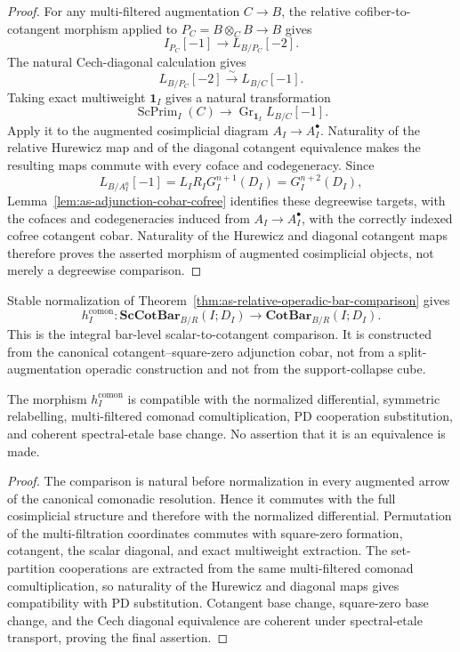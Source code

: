 \begin{proof}
For any multi-filtered augmentation $C\to B$, the relative
cofiber-to-cotangent morphism applied to
$P_C=B\otimes_C B\to B$ gives
\[
    I_{P_C}[-1]
    \longrightarrow
    L_{B/P_C}[-2].
\]
The natural Cech-diagonal calculation gives
\[
    L_{B/P_C}[-2]
    \xrightarrow{\sim}
    L_{B/C}[-1].
\]
Taking exact multiweight $\mathbf1_I$ gives a natural transformation
\[
    \operatorname{ScPrim}_I(C)
    \longrightarrow
    \operatorname{Gr}_{\mathbf1_I}L_{B/C}[-1].
\]
Apply it to the augmented cosimplicial diagram
$A_I\to A_I^\bullet$.  Naturality of the relative Hurewicz map and of the
diagonal cotangent equivalence makes the resulting maps commute with every
coface and codegeneracy.  Since
\[
    L_{B/A_I^n}[-1]
    =
    L_I R_I G_I^{n+1}(D_I)
    =
    G_I^{n+2}(D_I),
\]
Lemma~\ref{lem:as-adjunction-cobar-cofree} identifies these degreewise targets,
with the cofaces and codegeneracies induced from $A_I\to A_I^\bullet$, with
the correctly indexed cofree cotangent cobar.  Naturality of the Hurewicz and
diagonal cotangent maps therefore proves the asserted morphism of augmented
cosimplicial objects, not merely a degreewise comparison.
\end{proof}

\begin{construction}
\label{con:as-bar-level-hurewicz}
Stable normalization of
Theorem~\ref{thm:as-relative-operadic-bar-comparison} gives
\[
\boxed{
    h_I^{\mathrm{comon}}:
    \mathbf{ScCotBar}_{B/R}(I;D_I)
    \longrightarrow
    \mathbf{CotBar}_{B/R}(I;D_I).
}
\]
This is the integral bar-level scalar-to-cotangent comparison.  It is
constructed from the canonical cotangent--square-zero adjunction cobar, not from a
split-augmentation operadic construction and not from the
support-collapse cube.
\end{construction}

\begin{proposition}
\label{prop:as-bar-level-hurewicz}
The morphism $h_I^{\mathrm{comon}}$ is compatible with the normalized
differential, symmetric relabelling, multi-filtered comonad comultiplication,
PD cooperation substitution, and coherent spectral-etale base change.  No
assertion that it is an equivalence is made.
\end{proposition}

\begin{proof}
The comparison is natural before normalization in every augmented arrow of
the canonical comonadic resolution.  Hence it commutes with the full
cosimplicial structure and therefore with the normalized differential.
Permutation of the multi-filtration coordinates commutes with square-zero
formation, cotangent, the scalar diagonal, and exact multiweight extraction.
The set-partition cooperations are extracted from the same multi-filtered
comonad comultiplication, so naturality of the Hurewicz and diagonal maps gives
compatibility with PD substitution.  Cotangent base change, square-zero base
change, and the Cech diagonal equivalence are coherent under spectral-etale
transport, proving the final assertion.
\end{proof}

